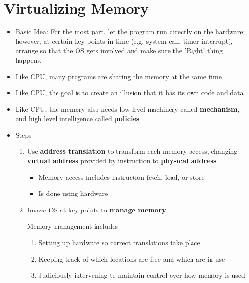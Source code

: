 \documentclass[12pt]{article}
\begin{document}
\section*{Virtualizing Memory}
\begin{itemize}
    \item Basic Idea: For the most part, let the program run directly on the hardware;
    however, at certain key points in time (e.g. system call, timer interrupt), arrange
    so that the OS gets involved and make sure the 'Right' thing happens.
    \item Like CPU, many programs are sharing the memory at the same time
    \item Like CPU, the goal is to create an illusion that it has its own code and data
    \item Like CPU, the memory also needs low-level machinery called \textbf{mechanism},
    and high level intelligence called \textbf{policies}
    \item Steps

    \begin{enumerate}[1.]
        \item Use \textbf{address translation} to transform each memory access,
        changing \textbf{virtual address} provided by instruction to \textbf{physical address}
        \begin{itemize}
            \item Memory access includes instruction fetch, load, or store
            \item Is done using hardware
        \end{itemize}
        \item Invove OS at key points to \textbf{manage memory}

        \bigskip

        Memory management includes

        \bigskip

        \begin{enumerate}[1.]
            \item Setting up hardware so correct translations take place
            \item Keeping track of which locations are free and which are in use
            \item Judiciously intervening to maintain control over how memory is used
        \end{enumerate}

        \bigskip
    \end{enumerate}
\end{itemize}
\end{document}
